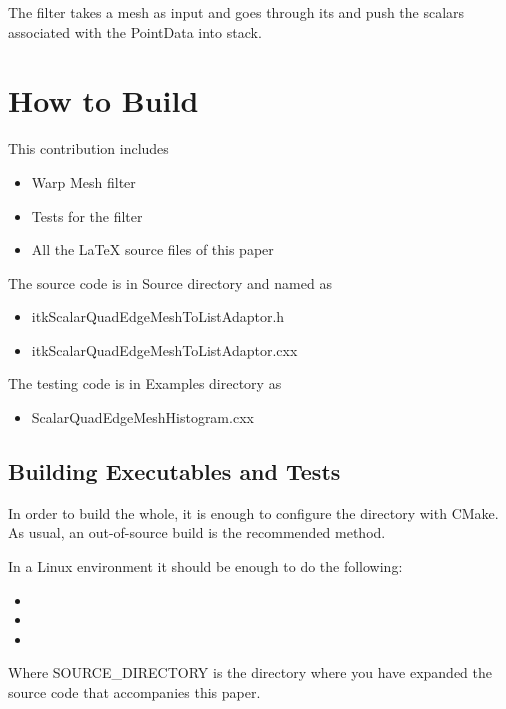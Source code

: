 \documentclass{InsightArticle}
\begin{document}
The filter takes a mesh as input and goes through its  and 
push the scalars associated with the PointData into stack.
 

\section{How to Build}

This contribution includes

\begin{itemize}
\item Warp Mesh filter
\item Tests for the filter
\item All the LaTeX source files of this paper
\end{itemize}

The source code is in Source directory and named as 

\begin{itemize}
\item itkScalarQuadEdgeMeshToListAdaptor.h
\item itkScalarQuadEdgeMeshToListAdaptor.cxx
\end{itemize}


The testing code is in Examples directory as

\begin{itemize}
\item ScalarQuadEdgeMeshHistogram.cxx
\end{itemize}

\subsection{Building Executables and Tests}

In order to build the whole, it is enough to configure the directory with
CMake. As usual, an out-of-source build is the recommended method.

In a Linux environment it should be enough to do the following:

\begin{itemize}
\item {}
\item {}
\item {}
\end{itemize}

Where SOURCE\_DIRECTORY is the directory where you have expanded the source
code that accompanies this paper.
\end{document}
